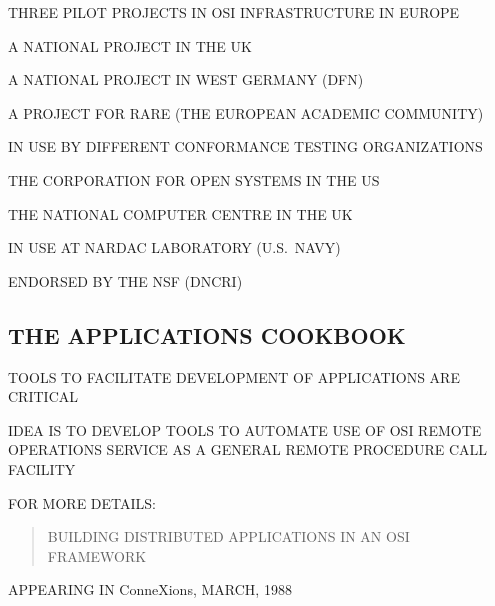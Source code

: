 \begin{bwslide}

\begin{nrtc}
\item	THREE PILOT PROJECTS IN OSI INFRASTRUCTURE IN EUROPE
    \begin{nrtc}
    \item	A NATIONAL PROJECT IN THE UK

    \item	A NATIONAL PROJECT IN WEST GERMANY (DFN)

    \item	A PROJECT FOR RARE (THE EUROPEAN ACADEMIC COMMUNITY)
    \end{nrtc}

\item	IN USE BY DIFFERENT CONFORMANCE TESTING ORGANIZATIONS
    \begin{nrtc}
    \item	THE CORPORATION FOR OPEN SYSTEMS IN THE US

    \item	THE NATIONAL COMPUTER CENTRE IN THE UK
    \end{nrtc}

\item	IN USE AT NARDAC LABORATORY (U.S.~NAVY)

\item	ENDORSED BY THE NSF (DNCRI)
\end{nrtc}
\end{bwslide}


\begin{bwslide}
\part*	{THE APPLICATIONS COOKBOOK}\bf

\begin{nrtc}
\item	TOOLS TO FACILITATE DEVELOPMENT OF APPLICATIONS ARE CRITICAL

\item	IDEA IS TO DEVELOP TOOLS TO AUTOMATE USE OF OSI REMOTE OPERATIONS
	SERVICE AS A GENERAL REMOTE PROCEDURE CALL FACILITY

\item	FOR MORE DETAILS:
\begin{quote}
BUILDING DISTRIBUTED APPLICATIONS IN AN OSI FRAMEWORK
\end{quote}
APPEARING IN ConneXions, MARCH, 1988
\end{nrtc}
\end{bwslide}


